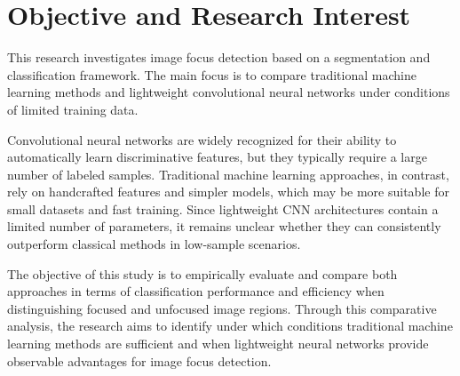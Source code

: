 \section{Objective and Research Interest}
This research investigates image focus detection based on a segmentation and
classification framework. The main focus is to compare traditional machine
learning methods and lightweight convolutional neural networks under conditions
of limited training data.

Convolutional neural networks are widely recognized for their ability to
automatically learn discriminative features, but they typically require a large
number of labeled samples. Traditional machine learning approaches, in
contrast, rely on handcrafted features and simpler models, which may be more
suitable for small datasets and fast training. Since lightweight CNN
architectures contain a limited number of parameters, it remains unclear
whether they can consistently outperform classical methods in low-sample
scenarios.

The objective of this study is to empirically evaluate and compare both
approaches in terms of classification performance and efficiency when
distinguishing focused and unfocused image regions. Through this comparative
analysis, the research aims to identify under which conditions traditional
machine learning methods are sufficient and when lightweight neural networks
provide observable advantages for image focus detection.
